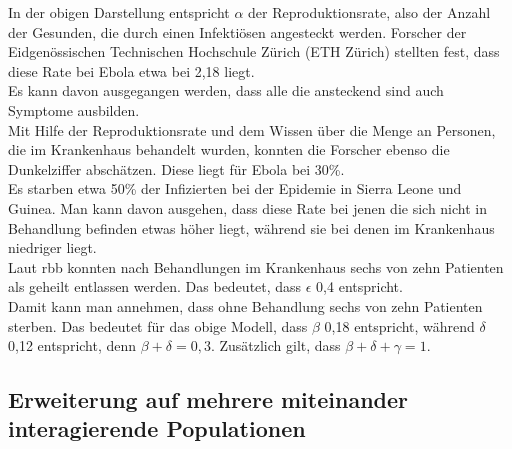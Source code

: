 In der obigen Darstellung entspricht $\alpha$ der Reproduktionsrate, also der Anzahl der Gesunden, die durch einen Infektiösen angesteckt werden. Forscher der Eidgenössischen Technischen Hochschule Zürich (ETH Zürich) stellten fest, dass diese Rate bei Ebola etwa bei 2,18 liegt.\\
Es kann davon ausgegangen werden, dass alle die ansteckend sind auch Symptome ausbilden.\\
Mit Hilfe der Reproduktionsrate und dem Wissen über die Menge an Personen, die im Krankenhaus behandelt wurden, konnten die Forscher ebenso die Dunkelziffer abschätzen. Diese liegt für Ebola bei 30\%.\\
Es starben etwa 50\% der Infizierten bei der Epidemie in Sierra Leone und Guinea. Man kann davon ausgehen, dass diese Rate bei jenen die sich nicht in Behandlung befinden etwas höher liegt, während sie bei denen im Krankenhaus niedriger liegt.\\
Laut rbb konnten nach Behandlungen im Krankenhaus sechs von zehn Patienten als geheilt entlassen werden. Das bedeutet, dass $\epsilon$ 0,4 entspricht. \\
Damit kann man annehmen, dass ohne Behandlung sechs von zehn Patienten sterben. Das bedeutet für das obige Modell, dass $\beta$ 0,18 entspricht, während $\delta$ 0,12 entspricht, denn $\beta + \delta = 0,3$. Zusätzlich gilt, dass $\beta + \delta + \gamma = 1$. \\
\subsection{Erweiterung auf mehrere miteinander interagierende Populationen}\label{ssec:multiPop}
\steffen
